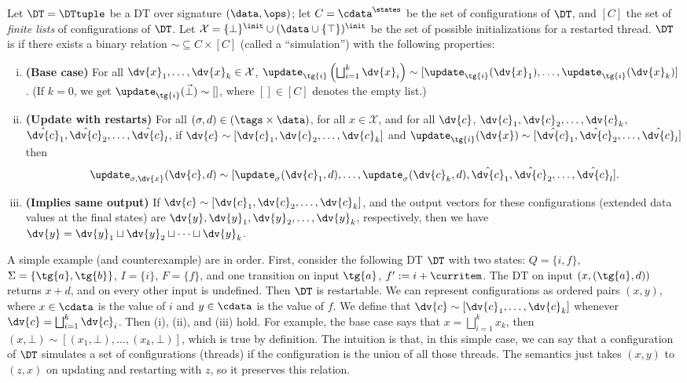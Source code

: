 \begin{definition}[Restartability]
\label{dt:definition:restartability}
Let $\DT = \DTtuple$ be a DT over signature $(\data, \ops)$;
let $C = \cdata^\states$ be the set of configurations of $\DT$, and
$[C]$ the set of \emph{finite lists} of configurations of $\DT$.
Let $\mathcal{X} = \{\bot\}^\init \cup (\data \cup \{\top\})^\init$ be the set of possible initializations for a restarted thread.
$\DT$ is  if there exists a binary relation $\sim \subseteq C \times [C]$
(called a ``simulation'') with the following properties:
\begin{enumerate}[i.]
\item \textbf{(Base case)}
  For all $\dv{x}_1, \ldots, \dv{x}_k \in \mathcal{X}$,
  $\update_{{\tg{i}}}\left(\bigsqcup_{i=1}^k \dv{x}_i\right) \sim [\update_{{\tg{i}}}(\dv{x}_1),\ldots,\update_{{\tg{i}}}(\dv{x}_k)]$. (If $k = 0$, we get $\update_{{\tg{i}}}(\vec{\bot}) \sim []$, where $[] \in [C]$ denotes the empty list.)
\item
  \textbf{(Update with restarts)} For all $(\sigma, d) \in (\tags \times \data)$,
  for all $x \in \mathcal{X}$,
  and for all $\dv{c}$, $\dv{c}_1, \dv{c}_2, \ldots, \dv{c}_k$, $\hat{\dv{c}}_1, \hat{\dv{c}}_2, \ldots, \hat{\dv{c}}_l$,
  if $\dv{c} \sim [\dv{c}_1, \dv{c}_2, \ldots, \dv{c}_k]$
  and $\update_{{\tg{i}}}(\dv{x}) \sim [\hat{\dv{c}}_1, \hat{\dv{c}}_2, \ldots, \hat{\dv{c}}_l]$
  then
  \[\update_{\sigma,\dv{x}}(\dv{c},d) \sim [\update_{\sigma}(\dv{c}_1,d), \ldots, \update_{\sigma}(\dv{c}_k,d), \hat{\dv{c}}_1, \hat{\dv{c}}_2, \ldots, \hat{\dv{c}}_l].\]
\item
  \textbf{(Implies same output)}
  If $\dv{c} \sim [\dv{c}_1, \dv{c}_2, \ldots, \dv{c}_k]$,
  and the output vectors for these configurations (extended data values at the final states) are $\dv{y}, \dv{y}_1, \dv{y}_2, \ldots, \dv{y}_k$, respectively, then we have $\dv{y} = \dv{y}_1 \sqcup \dv{y}_2 \sqcup \cdots \sqcup \dv{y}_k$.
\end{enumerate}
\end{definition}

A simple example (and counterexample) are in order. First, consider the following DT $\DT$ with two states: $Q = \{i,f\}$, $\Sigma = \{{\tg{a}},{\tg{b}}\}$, $I = \{i\}$, $F = \{f\}$, and one transition on input ${\tg{a}}$, $f' := i + \curritem$. The DT on input $(x,({\tg{a}},d))$ returns $x + d$, and on every other input is undefined. Then $\DT$ is restartable. We can represent configurations as ordered pairs $(x,y)$, where $x \in \cdata$ is the value of $i$ and $y \in \cdata$ is the value of $f$. We define that $\dv{c} \sim [\dv{c}_1, \ldots, \dv{c}_k]$ whenever $\dv{c} = \bigsqcup_{i=1}^k \dv{c}_i$. Then (i), (ii), and (iii) hold. For example, the base case says that $x = \bigsqcup_{i=1}^k x_k$, then $(x,\bot) \sim [(x_1,\bot), \ldots, (x_k,\bot)]$, which is true by definition.
The intuition is that, in this simple case, we can say that a configuration of $\DT$ simulates a set of configurations (threads) if the configuration is the union of all those threads. The semantics just takes $(x,y)$ to $(z,x)$ on updating and restarting with $z$, so it preserves this relation.

